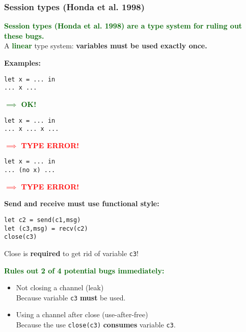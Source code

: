 \documentclass[aspectratio=169]{beamer}
\newcommand{\remph}[1] {\textcolor{red}{\textbf{#1}}}
\newcommand{\gemph}[1] {\textcolor{darkgreen}{\textbf{#1}}}
\begin{document}
\begin{frame}[fragile]
  \frametitle{Session types (Honda et al. 1998)}
  \gemph{Session types (Honda et al. 1998) are a type system for ruling out these bugs.} \\
  A \gemph{linear} type system: \textbf{variables must be used exactly once.}
  \bigskip

  \noindent
  \begin{minipage}[t]{0.35\textwidth}
  \textbf{Examples:}

  \begin{lstlisting}
let x = ... in
... x ...
  \end{lstlisting}
  \gemph{$\implies$ OK!}

  \begin{lstlisting}
let x = ... in
... x ... x ...
  \end{lstlisting}
  \remph{$\implies$ TYPE ERROR!}

  \begin{lstlisting}
let x = ... in
... (no x) ...
  \end{lstlisting}
  \remph{$\implies$ TYPE ERROR!}
  \end{minipage}\begin{minipage}[t]{0.65\textwidth}
  \textbf{Send and receive must use functional style:}
  \begin{lstlisting}
let c2 = send(c1,msg)
let (c3,msg) = recv(c2)
close(c3)
  \end{lstlisting}
  Close is \textbf{required} to get rid of variable \lstinline|c3|!

  \bigskip
  \gemph{Rules out 2 of 4 potential bugs immediately:}
  \begin{itemize}
    \item Not closing a channel (leak) \\
    Because variable \lstinline|c3| \textbf{must} be used.
    \item Using a channel after close (use-after-free) \\
    Because the use \lstinline|close(c3)| \textbf{consumes} variable \lstinline|c3|.
  \end{itemize}
  \end{minipage}
\end{frame}
\end{document}
